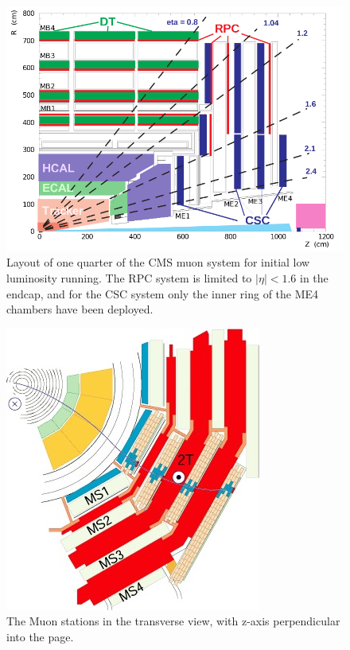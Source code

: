 \begin{figure}
\centering
\includegraphics[width=.9\textwidth]{figures/Muonsystem.png}
\caption{Layout of one quarter of the CMS muon system for initial low luminosity running. The 
RPC system is limited to $|\eta| < 1.6$ in the endcap, and for the CSC system only the inner ring of the ME4 chambers  have been deployed.}
\label{fig:Muonsystem}
\end{figure}

\begin{figure}
\centering
\includegraphics[width=.9\textwidth]{figures/MuStations.jpg}
\caption{The Muon stations in the transverse view, with z-axis perpendicular into the page.}
\label{fig:MuonStation}
\end{figure}
  

